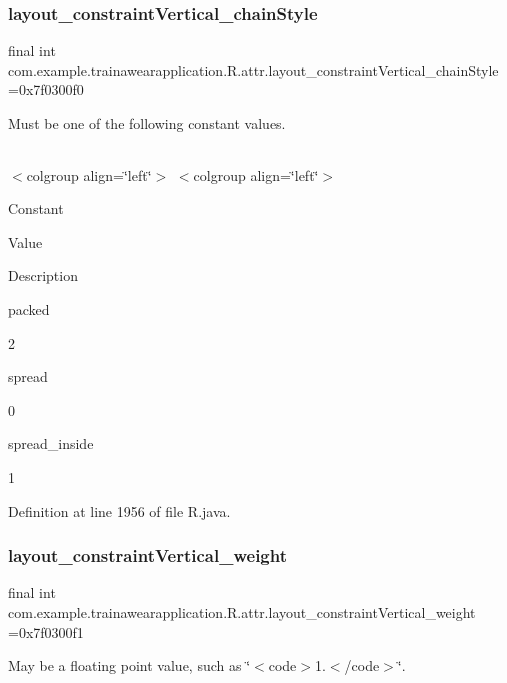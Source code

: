 \subsubsection{\texorpdfstring{layout\_constraintVertical\_chainStyle}{layout\_constraintVertical\_chainStyle}}
{\footnotesize\ttfamily final int com.\+example.\+trainawearapplication.\+R.\+attr.\+layout\+\_\+constraint\+Vertical\+\_\+chain\+Style =0x7f0300f0\hspace{0.3cm}{\ttfamily [static]}}

Must be one of the following constant values.

\tabulinesep=1mm
\begin{longtabu}spread 0pt [c]{*{0}{|X[-1]}|}
\hline
\end{longtabu}
$<$colgroup align=\char`\"{}left\char`\"{}$>$ $<$colgroup align=\char`\"{}left\char`\"{}$>$ 

Constant

Value

Description 

packed

2

spread

0

spread\+\_\+inside

1

Definition at line 1956 of file R.\+java.

\mbox{\label{classcom_1_1example_1_1trainawearapplication_1_1_r_1_1attr_a48b10a8767e7db303a507e332ac8c5e4}} 
\subsubsection{\texorpdfstring{layout\_constraintVertical\_weight}{layout\_constraintVertical\_weight}}
{\footnotesize\ttfamily final int com.\+example.\+trainawearapplication.\+R.\+attr.\+layout\+\_\+constraint\+Vertical\+\_\+weight =0x7f0300f1\hspace{0.3cm}{\ttfamily [static]}}

May be a floating point value, such as \char`\"{}$<$code$>$1.$<$/code$>$\char`\"{}. 

